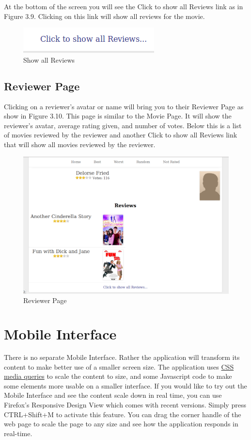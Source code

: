 \documentclass[10pt,a4paper]{scrreprt}
\begin{document}
At the bottom of the screen you will see the Click to show all Reviews link as in Figure 3.9. Clicking on this link will show all reviews for the movie.

\begin{figure}[H]
\centering
\includegraphics[scale=.5]{showreviews.png}
\caption{Show all Reviews}
\end{figure}

\section{Reviewer Page}
Clicking on a reviewer's avatar or name will bring you to their Reviewer Page as show in Figure 3.10. This page is similar to the Movie Page. It will show the reviewer's avatar, average rating given, and number of votes. Below this is a list of movies reviewed by the reviewer and another Click to show all Reviews link that will show all movies reviewed by the reviewer.

\begin{figure}[H]
\centering
\includegraphics[scale=.25]{reviewer.png}
\caption{Reviewer Page}
\end{figure}

\chapter{Mobile Interface}
There is no separate Mobile Interface. Rather the application will transform its content to make better use of a smaller screen size. The application uses \href{http://www.w3.org/TR/css3-mediaqueries/}{CSS media queries} to scale the content to size, and some Javascript code to make some elements more usable on a smaller interface. If you would like to try out the Mobile Interface and see the content scale down in real time, you can use Firefox's Responsive Design View which comes with recent versions. Simply press CTRL+Shift+M to activate this feature. You can drag the corner handle of the web page to scale the page to any size and see how the application responds in real-time.
\end{document}
